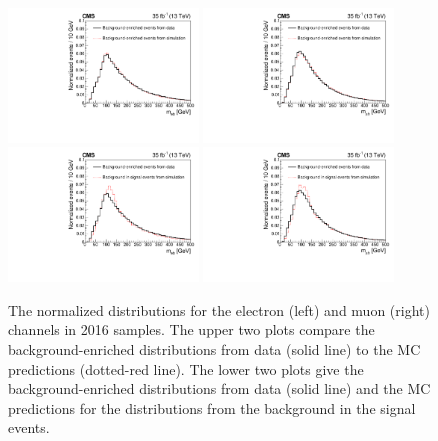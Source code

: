 \begin{figure}
    \centering
    \includegraphics[width=0.45\textwidth]{figure/BGClosureTest_16_el_CR_chi2_20_wobtag.pdf}
    \includegraphics[width=0.45\textwidth]{figure/BGClosureTest_16_mu_CR_chi2_20_wobtag.pdf}
    \includegraphics[width=0.45\textwidth]{figure/BGClosureTest_16_el_SR_chi2_20_wobtag.pdf}
    \includegraphics[width=0.45\textwidth]{figure/BGClosureTest_16_mu_SR_chi2_20_wobtag.pdf}
    \caption[The normalized \Mlb distributions in 2016 samples.]
    {
        The normalized \Mlb distributions for the electron (left) and muon (right) channels in 2016 samples.
        The upper two plots compare the background-enriched distributions from data (solid line) to the MC predictions (dotted-red line).
        The lower two plots give the background-enriched distributions from data (solid line) and the MC predictions for the distributions from the background in the signal events.
    }
    \label{fig:CR_SR_closure_test16}
\end{figure}


